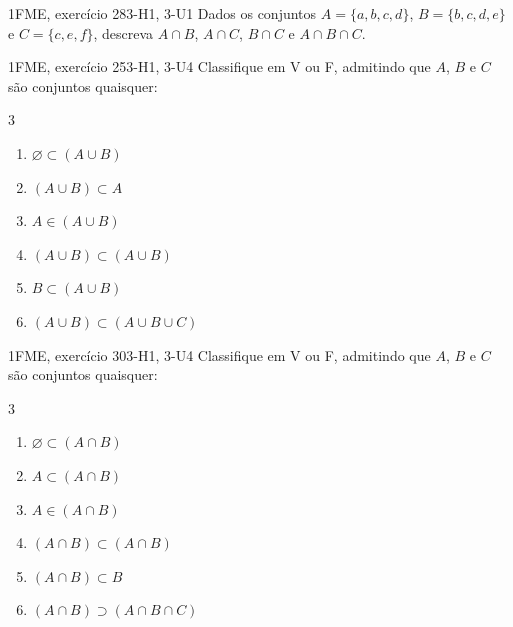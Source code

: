 \begin{questao}{1}{FME, exercício 28}{3-H1, 3-U1}\label{u3:fme28}
Dados os conjuntos $A=\{a,b,c,d\}$, $B=\{b,c,d,e\}$ e $C=\{c,e,f\}$, descreva $A\cap B$, $A\cap C$, $B\cap C$ e $A\cap B\cap C$.
\end{questao}

\begin{questao}{1}{FME, exercício 25}{3-H1, 3-U4}\label{u3:fme25}
Classifique em V ou F, admitindo que $A$, $B$ e $C$ são conjuntos quaisquer:
\begin{multicols}{3}
\begin{enumerate}[label=\alph*)]
  \item $\varnothing\subset(A\cup B)$
  \item $(A\cup B)\subset A$
  \item $A\in(A\cup B)$
  \item $(A\cup B)\subset(A\cup B)$
  \item $B\subset(A\cup B)$
  \item $(A\cup B)\subset(A\cup B\cup C)$
\end{enumerate}
\end{multicols}
\end{questao}

\begin{questao}{1}{FME, exercício 30}{3-H1, 3-U4}\label{u3:fme30}
Classifique em V ou F, admitindo que $A$, $B$ e $C$ são conjuntos quaisquer:
\begin{multicols}{3}
\begin{enumerate}[label=\alph*)]
  \item $\varnothing\subset(A\cap B)$
  \item $A\subset(A\cap B)$
  \item $A\in(A\cap B)$
  \item $(A\cap B)\subset(A\cap B)$
  \item $(A\cap B)\subset B$
  \item $(A\cap B)\supset(A\cap B\cap C)$
\end{enumerate}
\end{multicols}
\end{questao}

